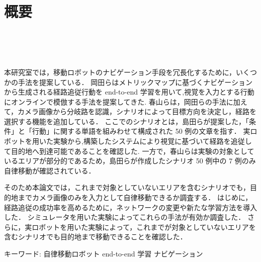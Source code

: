 \chapter*{概要}
\thispagestyle{empty}
%
\begin{center}
  \scalebox{1.0}{視覚と行動のend-to-end学習により}\\
  \vspace{-1.0zh}
  \scalebox{1.0}{経路追従行動を模倣する手法の提案}\\
  \scalebox{1.0}{-トポロジカルマップとシナリオに基づくナビゲーションの改良と調査-}\\
\end{center}
\vspace{1.0zh}

本研究室では，移動ロボットのナビゲーション手段を冗長化するために，いくつかの手法を提案している．
岡田らはメトリックマップに基づくナビゲーションから生成される経路追従行動を end-to-end 学習を用いて,視覚を入力とする行動にオンラインで模倣する手法を提案してきた.
春山らは，岡田らの手法に加えて，カメラ画像から分岐路を認識，シナリオによって目標方向を決定し，経路を選択する機能を追加している．
ここでのシナリオとは，島田らが提案した，「条件」と「行動」に関する単語を組みわせて構成された 50 例の文章を指す．
実ロボットを用いた実験から,構築したシステムにより視覚に基づいて経路を追従して目的地へ到達可能であることを確認した.
一方で，春山らは実験の対象としているエリアが部分的であるため，島田らが作成したシナリオ 50 例中の 7 例のみ自律移動が確認されている．

そのため本論文では，これまで対象としていないエリアを含むシナリオでも，目的地までカメラ画像のみを入力として自律移動できるか調査する．
はじめに，経路追従の成功率を高めるために，ネットワークの変更や新たな学習方法を導入した．
シミュレータを用いた実験によってこれらの手法が有効か調査した．
さらに，実ロボットを用いた実験によって，これまでが対象としていないエリアを含むシナリオでも目的地まで移動できることを確認した．

キーワード: 自律移動ロボット end-to-end 学習 ナビゲーション
%
\newpage

